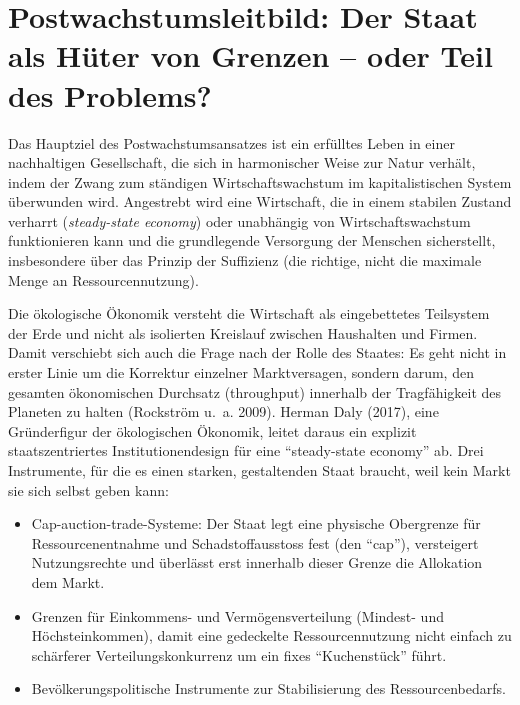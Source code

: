 \documentclass[
  nswissgerman,
  a4paper,
  DIV=11,
  numbers=noendperiod,
  oneside,
  openany]{scrreprt}
\begin{document}
\section{Postwachstumsleitbild: Der Staat als Hüter von Grenzen -- oder
Teil des
Problems?}\label{postwachstumsleitbild-der-staat-als-huxfcter-von-grenzen-oder-teil-des-problems}

Das Hauptziel des Postwachstumsansatzes ist ein erfülltes Leben in einer
nachhaltigen Gesellschaft, die sich in harmonischer Weise zur Natur
verhält, indem der Zwang zum ständigen Wirtschaftswachstum im
kapitalistischen System überwunden wird. Angestrebt wird eine
Wirtschaft, die in einem stabilen Zustand verharrt (\emph{steady-state
economy}) oder unabhängig von Wirtschaftswachstum funktionieren kann und
die grundlegende Versorgung der Menschen sicherstellt, insbesondere über
das Prinzip der Suffizienz (die richtige, nicht die maximale Menge an
Ressourcennutzung).

Die ökologische Ökonomik versteht die Wirtschaft als eingebettetes
Teilsystem der Erde und nicht als isolierten Kreislauf zwischen
Haushalten und Firmen. Damit verschiebt sich auch die Frage nach der
Rolle des Staates: Es geht nicht in erster Linie um die Korrektur
einzelner Marktversagen, sondern darum, den gesamten ökonomischen
Durchsatz (throughput) innerhalb der Tragfähigkeit des Planeten zu
halten (Rockström u.~a. 2009). Herman Daly (2017), eine Gründerfigur der
ökologischen Ökonomik, leitet daraus ein explizit staatszentriertes
Institutionendesign für eine ``steady-state economy'' ab. Drei
Instrumente, für die es einen starken, gestaltenden Staat braucht, weil
kein Markt sie sich selbst geben kann:

\begin{itemize}
\item
  Cap-auction-trade-Systeme: Der Staat legt eine physische Obergrenze
  für Ressourcenentnahme und Schadstoffausstoss fest (den ``cap''),
  versteigert Nutzungsrechte und überlässt erst innerhalb dieser Grenze
  die Allokation dem Markt.
\item
  Grenzen für Einkommens- und Vermögensverteilung (Mindest- und
  Höchsteinkommen), damit eine gedeckelte Ressourcennutzung nicht
  einfach zu schärferer Verteilungskonkurrenz um ein fixes
  ``Kuchenstück'' führt.
\item
  Bevölkerungspolitische Instrumente zur Stabilisierung des
  Ressourcenbedarfs.
\end{itemize}
\end{document}
